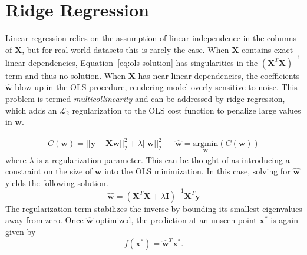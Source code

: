 \documentclass[11pt]{article}
\begin{document}
\section*{Ridge Regression} 
Linear regression relies on the assumption of linear independence in the
columns of $\mathbf{X}$, but for real-world datasets this is rarely the case.
When $\mathbf{X}$ contains exact linear dependencies,
Equation~\ref{eq:ols-solution} has singularities in the
$(\mathbf{X}^T\mathbf{X})^{-1}$ term and thus no solution.  
When $\mathbf{X}$ has near-linear dependencies, the coefficients
$\hat{\mathbf{w}}$ blow up in the OLS procedure, rendering model overly
sensitive to noise. 
This problem is termed {\it multicollinearity} and can be addressed by ridge
regression, which adds an $\mathcal{L}_2$ regularization to the OLS cost
function to penalize large values in $\mathbf{w}$.

\begin{align}
	C(\mathbf{w}) 
= 
	|| 
		\mathbf{y} 
	- 
		\mathbf{X} 
		\mathbf{w} 
	||_2^2 
+ 
	\lambda 
	|| 
	\mathbf{w}
	||_2^2 
&& 
	\hat{\mathbf{w}} 
=
	\underset{
				\mathbf{w}
			}
			{
					\mathrm{argmin}
			}
	(C(\mathbf{w})) 
\end{align} 
where $\lambda$ is a regularization parameter.  
This can be thought of as introducing a constraint on the size of $\mathbf{w}$
into the OLS minimization.
In this case, solving for $\mathbf{\hat{w}}$ yields the following solution.
\begin{equation} \label{eq:ridge-solution} \mathbf{\hat{w}} = ( \mathbf{X}^T
\mathbf{X} + \lambda \mathbf{I})^{-1} \mathbf{X}^T\mathbf{y} \end{equation} The
regularization term stabilizes the inverse by bounding its smallest eigenvalues
away from zero.
Once $\mathbf{\hat{w}}$ optimized, the prediction at an unseen point
$\mathbf{x^*}$ is again given by
\begin{equation}
	f(\mathbf{x^*}) = \mathbf{\hat{w}}^T\mathbf{x^*}.
\end{equation}
\end{document}
